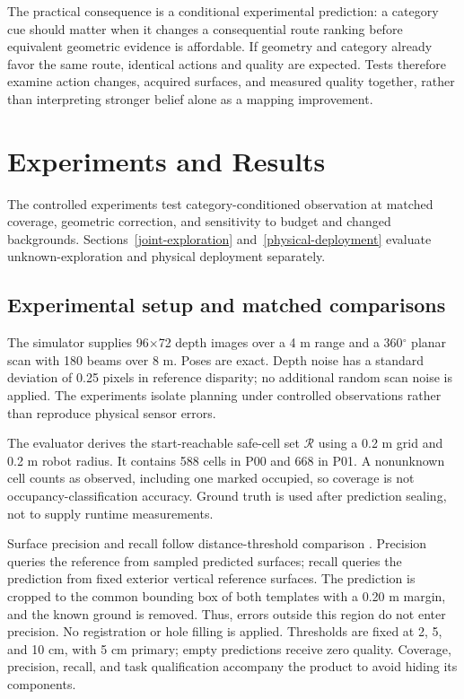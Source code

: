 The practical consequence is a conditional experimental prediction: a category cue should matter when it changes a consequential route ranking before equivalent geometric evidence is affordable. If geometry and category already favor the same route, identical actions and quality are expected. Tests therefore examine action changes, acquired surfaces, and measured quality together, rather than interpreting stronger belief alone as a mapping improvement.

\hypertarget{experiments-and-results}{%
\section{Experiments and Results}\label{experiments-and-results}}

The controlled experiments test category-conditioned observation at matched coverage, geometric correction, and sensitivity to budget and changed backgrounds. Sections~\ref{joint-exploration} and~\ref{physical-deployment} evaluate unknown-exploration and physical deployment separately.

\hypertarget{experimental-setup-and-matched-comparisons}{%
\subsection{Experimental setup and matched comparisons}\label{experimental-setup-and-matched-comparisons}}

The simulator supplies 96\ensuremath{\times}72 depth images over a 4 m range and a 360\ensuremath{^{\circ}} planar scan with 180 beams over 8 m. Poses are exact. Depth noise has a standard deviation of 0.25 pixels in reference disparity; no additional random scan noise is applied. The experiments isolate planning under controlled observations rather than reproduce physical sensor errors.

The evaluator derives the start-reachable safe-cell set \(\mathcal R\) using a 0.2 m grid and 0.2 m robot radius. It contains 588 cells in P00 and 668 in P01. A nonunknown cell counts as observed, including one marked occupied, so coverage is not occupancy-classification accuracy. Ground truth is used after prediction sealing, not to supply runtime measurements.

Surface precision and recall follow distance-threshold comparison \cite{ref14}. Precision queries the reference from sampled predicted surfaces; recall queries the prediction from fixed exterior vertical reference surfaces. The prediction is cropped to the common bounding box of both templates with a 0.20 m margin, and the known ground is removed. Thus, errors outside this region do not enter precision. No registration or hole filling is applied. Thresholds are fixed at 2, 5, and 10 cm, with 5 cm primary; empty predictions receive zero quality. Coverage, precision, recall, and task qualification accompany the product to avoid hiding its components.

